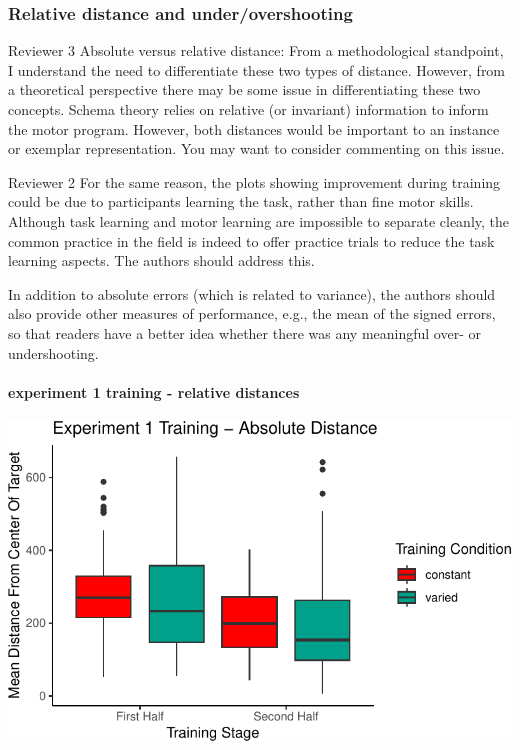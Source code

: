 \documentclass[
  12pt,
  letterpaper,
]{article}
\begin{document}
\subsubsection{Relative distance and
under/overshooting}\label{relative-distance-and-underovershooting}

Reviewer 3 Absolute versus relative distance: From a methodological
standpoint, I understand the need to differentiate these two types of
distance. However, from a theoretical perspective there may be some
issue in differentiating these two concepts. Schema theory relies on
relative (or invariant) information to inform the motor program.
However, both distances would be important to an instance or exemplar
representation. You may want to consider commenting on this issue.

Reviewer 2 For the same reason, the plots showing improvement during
training could be due to participants learning the task, rather than
fine motor skills. Although task learning and motor learning are
impossible to separate cleanly, the common practice in the field is
indeed to offer practice trials to reduce the task learning aspects. The
authors should address this.

In addition to absolute errors (which is related to variance), the
authors should also provide other measures of performance, e.g., the
mean of the signed errors, so that readers have a better idea whether
there was any meaningful over- or undershooting.

\paragraph{experiment 1 training - relative
distances}\label{experiment-1-training---relative-distances}

\includegraphics{full_files/figure-pdf/unnamed-chunk-63-1.pdf}
\end{document}
